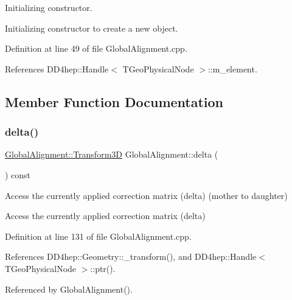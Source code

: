 Initializing constructor. 

Initializing constructor to create a new object. 

Definition at line 49 of file Global\+Alignment.\+cpp.



References D\+D4hep\+::\+Handle$<$ T\+Geo\+Physical\+Node $>$\+::m\+\_\+element.



\subsection{Member Function Documentation}
\hypertarget{class_d_d4hep_1_1_alignments_1_1_global_alignment_a347c222bf992dbf1b5b318b43069d789}{}\label{class_d_d4hep_1_1_alignments_1_1_global_alignment_a347c222bf992dbf1b5b318b43069d789} 
\subsubsection{\texorpdfstring{delta()}{delta()}}
{\footnotesize\ttfamily \hyperlink{class_d_d4hep_1_1_alignments_1_1_global_alignment_a328240cbc53ba92424336a5898ba49d3}{Global\+Alignment\+::\+Transform3D} Global\+Alignment\+::delta (\begin{DoxyParamCaption}{ }\end{DoxyParamCaption}) const}



Access the currently applied correction matrix (delta) (mother to daughter) 

Access the currently applied correction matrix (delta) 

Definition at line 131 of file Global\+Alignment.\+cpp.



References D\+D4hep\+::\+Geometry\+::\+\_\+transform(), and D\+D4hep\+::\+Handle$<$ T\+Geo\+Physical\+Node $>$\+::ptr().



Referenced by Global\+Alignment().

\hypertarget{class_d_d4hep_1_1_alignments_1_1_global_alignment_a2210d7d04dd715afa45c35fbbaa0c601}{}\label{class_d_d4hep_1_1_alignments_1_1_global_alignment_a2210d7d04dd715afa45c35fbbaa0c601} 
